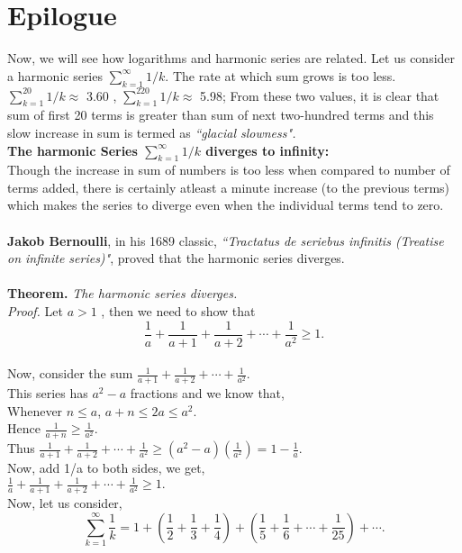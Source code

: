\documentclass[a4paper,reqno,11pt]{book}
\theoremstyle{plain}%
\theoremstyle{definition}
\begin{document}
\section{Epilogue}
Now, we will see how logarithms and harmonic series are related.
Let us consider a harmonic series $\sum_{k=1}^{\infty}1/k$. The rate at which sum grows is too less. $\sum_{k=1}^{20}1/k \approx$ 3.60 , $\sum_{k=1}^{220}1/k \approx $ 5.98;
From these two values, it is clear that sum of first 20 terms is greater than sum of next two-hundred terms and this slow increase in sum is termed as 
\textit{``glacial slowness".}\\
\textbf{The harmonic Series $\sum_{k=1}^{\infty}1/k$ diverges to infinity:}\\
Though the increase in sum of numbers is too less when compared to number of terms added, there is certainly atleast a minute increase (to the previous terms) which makes the series to diverge even when the individual terms tend to zero.\\
\\
\textbf{Jakob Bernoulli},  in his 1689 classic, \textit{``Tractatus de 
seriebus infinitis (Treatise on infinite series)"},  proved that the harmonic series diverges.\\
\\
\textbf{Theorem.} \textit{The harmonic series diverges.}\\
\textit{Proof.} Let $a>1$ , then we need to show that\\
 $$ \frac{1}{a} + \frac{1}{a+1} + \frac{1}{a+2} + \cdots + \frac{1}{a^2} \geq 1. $$\\
Now, consider the sum $ \frac{1}{a+1} + \frac{1}{a+2} + \cdots + \frac{1}{a^2} .$ \\
This series has $a^2 - a$ fractions and we know that,\\
Whenever $n \leq a$, $a+n \leq 2a \leq a^2$.\\
Hence $\frac{1}{a+n} \geq \frac{1}{a^2}. $\\
Thus  $ \frac{1}{a+1} + \frac{1}{a+2} + \cdots + \frac{1}{a^2} \geq (a^2-a)(\frac{1}{a^2}) = 1 - \frac{1}{a}. $\\
Now, add 1/a to both sides, we get,\\
 $\frac{1}{a} + \frac{1}{a+1} + \frac{1}{a+2} + \cdots + \frac{1}{a^2} \geq 1.$ \\
 Now, let us consider,\\
  $$\sum_{k=1}^{\infty}\frac{1}{k} = 1 + (\frac{1}{2} + \frac{1}{3} + \frac{1}{4}) +
  (\frac{1}{5} + \frac{1}{6} + \cdots + \frac{1}{25}) + \cdots. $$\\
\end{document}
